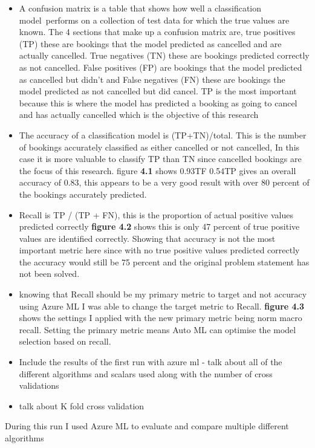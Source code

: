 \begin{itemize}
\item A confusion matrix is a table that shows how well a classification model performs on a collection of test data for which the true values are known. The 4 sections that make up a confusion matrix are, true positives (TP) these are bookings that the model predicted as cancelled and are actually cancelled. True negatives (TN) these are bookings predicted correctly as not cancelled. False positives (FP) are bookings that the model predicted as cancelled but didn't and False negatives (FN) these are bookings the model predicted as not cancelled but did cancel. TP is the most important because this is where the model has predicted a booking as going  to cancel and has actually cancelled which is the objective of this research
\item  The accuracy of a classification model is (TP+TN)/total. This is the number of bookings accurately classified as either cancelled or not cancelled, In this case it is more valuable to classify TP than TN since cancelled bookings are the focus of this research. figure \textbf{4.1} shows  0.93TF 0.54TP gives an overall accuracy of 0.83, this appears to be a very good result with over 80 percent of the bookings accurately predicted.
\item Recall is TP / (TP + FN), this is the proportion of actual positive values predicted correctly \textbf{figure 4.2} shows this is only 47 percent of true positive values are identified correctly. Showing that accuracy is not the most important metric here since with no true positive values predicted correctly the accuracy would still be 75 percent and the original problem statement has not been solved. 
\item knowing that Recall should be my primary metric to target and not accuracy using Azure ML I was able to change the target metric to Recall. \textbf{figure 4.3} shows the settings I applied with the new primary metric being norm macro recall. Setting the primary metric means Auto ML can optimise the model selection based on recall.
\item Include the results of the first run with azure ml - talk about all of the different algorithms and scalars used along with the number of cross validations
\item talk about K fold cross validation
\end{itemize}



During this run I used Azure ML to evaluate and compare multiple different algorithms

